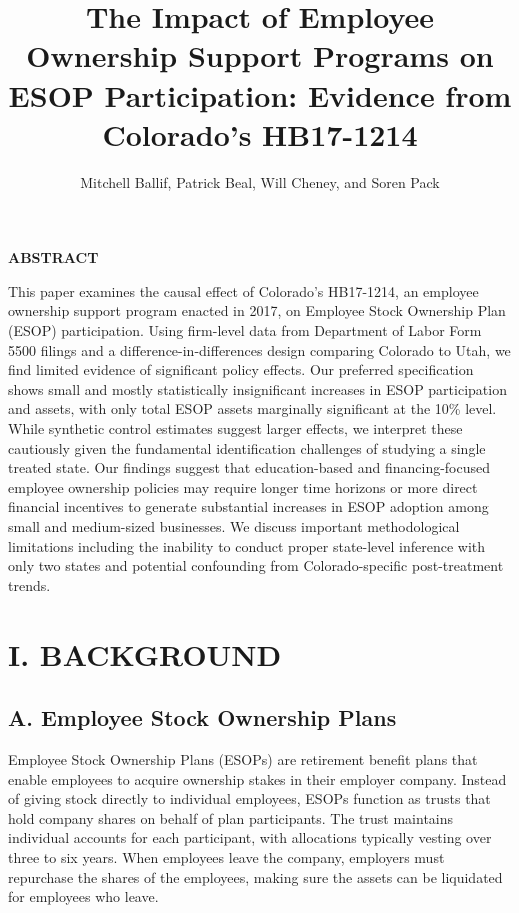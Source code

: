 \documentclass[12pt]{article}
\title{\normalsize The Impact of Employee Ownership Support Programs on ESOP  Participation: Evidence from Colorado's HB17-1214}
\author{\normalsize Mitchell Ballif, Patrick Beal, Will Cheney, and Soren Pack}
\date{}
\renewcommand{\normalsize}{\fontsize{12pt}{14pt}\selectfont}
\begin{document}
\maketitle

\begin{center}
\normalsize \textbf{ABSTRACT}
\end{center}

This paper examines the causal effect of Colorado's HB17-1214, an employee ownership support program enacted in 2017, on Employee Stock Ownership Plan (ESOP) participation. Using firm-level data from Department of Labor Form 5500 filings and a difference-in-differences design comparing Colorado to Utah, we find limited evidence of significant policy effects. Our preferred specification shows small and mostly statistically insignificant increases in ESOP participation and assets, with only total ESOP assets marginally significant at the 10\% level. While synthetic control estimates suggest larger effects, we interpret these cautiously given the fundamental identification challenges of studying a single treated state. Our findings suggest that education-based and financing-focused employee ownership policies may require longer time horizons or more direct financial incentives to generate substantial increases in ESOP adoption among small and medium-sized businesses. We discuss important methodological limitations including the inability to conduct proper state-level inference with only two states and potential confounding from Colorado-specific post-treatment trends.

\vspace{12pt}

\renewcommand{\thesection}{\Roman{section}}
\renewcommand{\thesubsection}{\Roman{subsection}}

\section*{\centering \normalsize \textbf{I. BACKGROUND}}

\subsection*{A. Employee Stock Ownership Plans}

Employee Stock Ownership Plans (ESOPs) are retirement benefit plans that enable employees to acquire ownership stakes in their employer company. Instead of giving stock directly to individual employees, ESOPs function as trusts that hold company shares on behalf of plan participants. The trust maintains individual accounts for each participant, with allocations typically vesting over three to six years. When employees leave the company, employers must repurchase the shares of the employees, making sure the assets can be liquidated for employees who leave.
\end{document}

